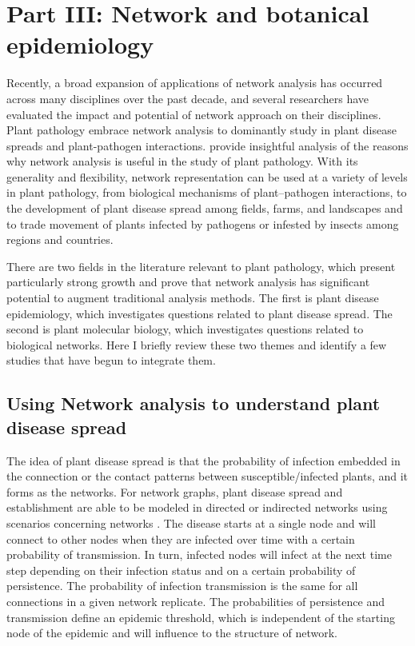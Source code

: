 \section*{Part III: Network and botanical epidemiology}
\label{ch:partthree}

Recently, a broad expansion of applications of network analysis has occurred across many disciplines over the past decade, and several researchers have evaluated the impact and potential of network approach on their disciplines. Plant pathology embrace network analysis to dominantly study in plant disease spreads and plant-pathogen interactions.  provide insightful analysis of the reasons why network analysis is useful in the study of plant pathology. With its generality and flexibility, network representation can be used at a variety of levels in plant pathology, from biological mechanisms of plant–pathogen interactions, to the development of plant disease spread among fields, farms, and landscapes and to trade movement of plants infected by pathogens or infested by insects among regions and countries. 

There are two fields in the literature relevant to plant pathology, which present particularly strong growth and prove that network analysis has significant potential to augment traditional analysis methods. The first is plant disease epidemiology, which investigates questions related to plant disease spread. The second is plant molecular biology, which investigates questions related to biological networks. Here I briefly review these two themes and identify a few studies that have begun to integrate them.


\subsection*{Using Network analysis to understand plant disease spread}

The idea of plant disease spread is that the probability of infection embedded in the connection or the contact patterns between susceptible/infected plants, and it forms as the networks. For network graphs, plant disease spread and establishment are able to be modeled in directed or indirected networks using scenarios concerning networks . The disease starts at a single node and will connect to other nodes when they are infected over time with a certain probability of transmission. In turn, infected nodes will infect at the next time step depending on their infection status and on a certain probability of persistence. The probability of infection transmission is the same for all connections in a given network replicate. The probabilities of persistence and transmission define an epidemic threshold, which is independent of the starting node of the epidemic and will influence to the structure of network. 

